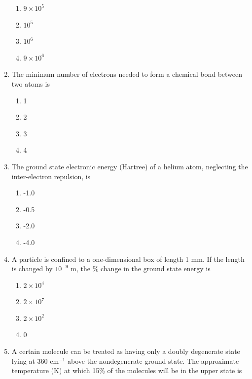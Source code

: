 \documentclass[12pt]{article}
\begin{document}
\begin{enumerate}
\begin{enumerate}
\item $9 \times 10^5$
\item $10^5$
\item $10^6$
\item $9 \times 10^6$
\end{enumerate}    \hfill{}




\item The minimum number of electrons needed to form a chemical bond between two atoms is

\begin{enumerate}
\item 1
\item 2
\item 3
\item 4
\end{enumerate}    \hfill{}




\item The ground state electronic energy (Hartree) of a helium atom, neglecting the inter-electron repulsion, is

\begin{enumerate}
\item -1.0
\item -0.5
\item -2.0
\item -4.0
\end{enumerate}    \hfill{}




\item A particle is confined to a one-dimensional box of length 1 mm. If the length is changed by $10^{-9}$ m, the \% change in the ground state energy is

\begin{enumerate}
\item $2 \times 10^4$
\item $2 \times 10^7$
\item $2 \times 10^2$
\item 0
\end{enumerate}    \hfill{}




\item A certain molecule can be treated as having only a doubly degenerate state lying at 360 cm$^{-1}$ above the nondegenerate ground state. The approximate temperature (K) at which 15\% of the molecules will be in the upper state is


\end{enumerate}
\end{document}
